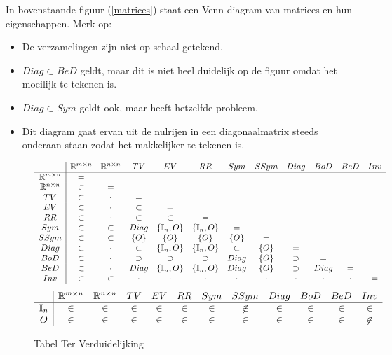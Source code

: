 \documentclass[lineaire_algebra_oplossingen.tex]{subfiles}
\begin{document}
In bovenstaande figuur (\ref{matrices}) staat een Venn diagram van matrices en hun eigenschappen.
Merk op:
\begin{itemize}
\item De verzamelingen zijn niet op schaal getekend.
\item $Diag \subset BeD$ geldt, maar dit is niet heel duidelijk op de figuur omdat het moeilijk te tekenen is.
\item $Diag \subset Sym$ geldt ook, maar heeft hetzelfde probleem.
\item Dit diagram gaat ervan uit de nulrijen in een diagonaalmatrix steeds onderaan staan zodat het makkelijker te tekenen is.
\end{itemize}


\begin{figure}[H]
\centering
\[
\begin{array}{c | c c c c c c c c c c c}
 & \mathbb{R}^{m\times n} & \mathbb{R}^{n\times n} & TV & EV & RR & Sym & SSym & Diag & BoD & BeD & Inv\\
 \hline
\mathbb{R}^{m\times n} 	& =\\
\mathbb{R}^{n\times n} 	& \subset 	& =\\
TV 						& \subset 	& \cdot 	& =\\
EV 						& \subset 	& \cdot 	& \subset 	& =\\
RR 						& \subset 	& \cdot 	& \subset 	& \subset 			& =\\ 
Sym 					& \subset	& \subset	& Diag		& \{\mathbb{I}_n,O\}& \{\mathbb{I}_n,O\}& =\\
SSym 					& \subset	& \subset	& \{O\}		& \{O\}				& \{O\} 			& \{O\}	& =\\
Diag 					& \subset	& \cdot		& \subset	& \{\mathbb{I}_n,O\}& \{\mathbb{I}_n,O\}& \subset	& \{O\}	& =\\
BoD 					& \subset	& \cdot		& \supset	& \supset 			& \supset			& Diag				& \{O\}	& \supset	& =\\
BeD 					& \subset	& \cdot		& Diag		& \{\mathbb{I}_n,O\}& \{\mathbb{I}_n,O\}& Diag				& \{O\} & \supset	& Diag	& =\\
Inv						& \subset	& \subset	& \cdot		& \cdot 			& \cdot 			& \cdot	& \cdot 		& \cdot	& \cdot		& \cdot 	& =\\
\end{array}
\]
\[
\begin{array}{c | c c c c c c c c c c c}
 & \mathbb{R}^{m\times n} & \mathbb{R}^{n\times n} & TV & EV & RR & Sym & SSym & Diag & BoD & BeD & Inv\\
\hline
\mathbb{I}_n 			& \in & \in & \in & \in & \in & \in & \not\in 	& \in & \in & \in & \in \\
O 						& \in & \in & \in & \in & \in & \in & \in 		& \in & \in & \in & \not\in\\
\end{array}
\]
\label{tabel}
\caption{Tabel Ter Verduidelijking}
\end{figure}
\end{document}
